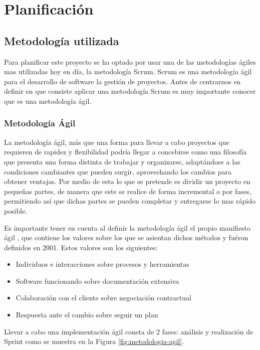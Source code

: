 \chapter{Planificación}

\section{Metodología utilizada}

Para planificar este proyecto se ha optado por usar una de las metodologías ágiles mas utilizadas hoy en día, la metodología Scrum. Scrum es una metodología ágil para el desarrollo de software la gestión de proyectos. Antes de centrarnos en definir en que consiste aplicar una metodología Scrum es muy importante conocer que es una metodología ágil.

\subsection{Metodología Ágil}

La metodología ágil, más que una forma para llevar a cabo proyectos que requieren de rapidez y flexibilidad podría llegar a concebirse como una filosofía que presenta una forma distinta de trabajar y organizarse, adaptándose a las condiciones cambiantes que pueden surgir, aprovechando los cambios para obtener ventajas. Por medio de esta lo que se pretende es dividir un proyecto en pequeñas partes, de manera que este se realice de forma incremental o por fases, permitiendo así que dichas partes se pueden completar y entregarse lo mas rápido posible. 

Es importante tener en cuenta al definir la metodología ágil el propio manifiesto ágil \cite{manifiesto-agil}, que contiene los valores sobre los que se asientan dichos métodos y fuéron definidos en 2001. Estos valores son los siguientes:

\begin{itemize}
	\item Individuos e interacciones sobre procesos y herramientas
	\item Software funcionando sobre documentación extensiva
	\item Colaboración con el cliente sobre negociación contractual
	\item Respuesta ante el cambio sobre seguir un plan
\end{itemize}

Llevar a cabo una implementación ágil consta de 2 fases: análisis y realización de Sprint como se muestra en la Figura \ref{fig:metodologia-agil}.

